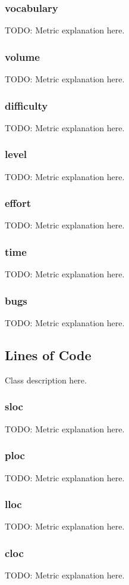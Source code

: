 \subsubsection{vocabulary}
TODO: Metric explanation here.
\subsubsection{volume}
TODO: Metric explanation here.
\subsubsection{difficulty}
TODO: Metric explanation here.
\subsubsection{level}
TODO: Metric explanation here.
\subsubsection{effort}
TODO: Metric explanation here.
\subsubsection{time}
TODO: Metric explanation here.
\subsubsection{bugs}
TODO: Metric explanation here.

\subsection{Lines of Code}

Class description here.

\subsubsection{sloc}
TODO: Metric explanation here.
\subsubsection{ploc}
TODO: Metric explanation here.
\subsubsection{lloc}
TODO: Metric explanation here.
\subsubsection{cloc}
TODO: Metric explanation here.
